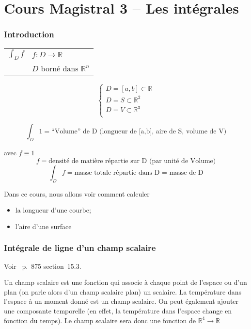 \part{Cours Magistral 3 -- Les intégrales}
\section{Introduction}

\begin{center}
\begin{tabular}{l l}

$\int_D f$ &  $f: D\to \mathbb{R}$ \\
&$D$ borné dans $\mathbb{R}^n$
\end{tabular}

\end{center}


\[
\left\{
\begin{array}{l}
D=[a,b]\subset\mathbb{R}\\
D=S\subset\mathbb{R}^2\\
D=V\subset\mathbb{R}^3\\
\end{array}
\right.
\]



\[\int_D 1 = \text{``Volume'' de D (longueur de [a,b], aire de S, volume de V)}\]

avec $f\equiv1$
\[ f=\text{densité de matière répartie sur D (par unité de Volume)} \]
\[\int_D f = \text{masse totale répartie dans D = masse de D}\]

Dans ce cours, nous allons voir comment calculer
\begin{itemize}
\item la longueur d'une courbe;
\item l'aire d'une surface
\end{itemize}

\section{Intégrale de ligne d'un champ scalaire}

Voir~\cite{adams2013calculus} p.~875 section~15.3.

Un champ scalaire est une fonction qui associe à chaque point de l'espace ou d'un plan (on parle alors d'un champ scalaire plan) un scalaire. La température dans l'espace à un moment donné est un champ scalaire. On peut également ajouter une composante temporelle (en effet, la température dans l'espace change en fonction du temps). Le champ scalaire sera donc une fonction de $\mathbb{R}^4 \to \mathbb{R} $

